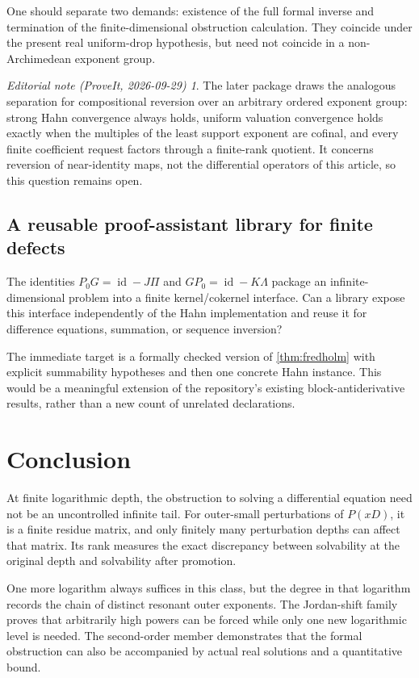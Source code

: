 \documentclass[11pt,a4paper]{article}
\numberwithin{equation}{section}
\theoremstyle{definition}
\theoremstyle{remark}
\newtheorem*{ednote}{Editorial note (ProveIt, 2026-09-29)}
\newcommand{\id}{\operatorname{id}}
\begin{document}
One should separate two demands: existence of the full formal inverse and termination of the finite-dimensional obstruction calculation. They coincide under the present real uniform-drop hypothesis, but need not coincide in a non-Archimedean exponent group.

\begin{ednote}\label{ed:ordered-groups}
The later package  draws the analogous separation for compositional reversion over an arbitrary ordered exponent group: strong Hahn convergence always holds, uniform valuation convergence holds exactly when the multiples of the least support exponent are cofinal, and every finite coefficient request factors through a finite-rank quotient. It concerns reversion of near-identity maps, not the differential operators of this article, so this question remains open.
\end{ednote}

\subsection{A reusable proof-assistant library for finite defects}
The identities $P_0G=\id-J\Pi$ and $GP_0=\id-K\Lambda$ package an infinite-dimensional problem into a finite kernel/cokernel interface. Can a library expose this interface independently of the Hahn implementation and reuse it for difference equations, summation, or sequence inversion?

The immediate target is a formally checked version of \cref{thm:fredholm} with explicit summability hypotheses and then one concrete Hahn instance. This would be a meaningful extension of the repository's existing block-antiderivative results, rather than a new count of unrelated declarations.

\section{Conclusion}
At finite logarithmic depth, the obstruction to solving a differential equation need not be an uncontrolled infinite tail. For outer-small perturbations of $P(xD)$, it is a finite residue matrix, and only finitely many perturbation depths can affect that matrix. Its rank measures the exact discrepancy between solvability at the original depth and solvability after promotion.

One more logarithm always suffices in this class, but the degree in that logarithm records the chain of distinct resonant outer exponents. The Jordan-shift family proves that arbitrarily high powers can be forced while only one new logarithmic level is needed. The second-order member demonstrates that the formal obstruction can also be accompanied by actual real solutions and a quantitative bound.
\end{document}
